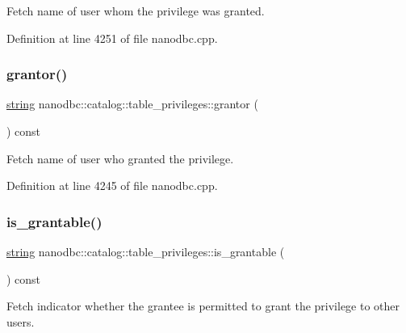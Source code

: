 Fetch name of user whom the privilege was granted. 



Definition at line 4251 of file nanodbc.\+cpp.

\mbox{\label{classnanodbc_1_1catalog_1_1table__privileges_a2b49c7a12f7e7ce3ea2c4f7106635245}} 
\subsubsection{\texorpdfstring{grantor()}{grantor()}}
{\footnotesize\ttfamily \mbox{\hyperlink{namespacenanodbc_abfc0ece56278e590911ec8352774c212}{string}} nanodbc\+::catalog\+::table\+\_\+privileges\+::grantor (\begin{DoxyParamCaption}{ }\end{DoxyParamCaption}) const}



Fetch name of user who granted the privilege. 



Definition at line 4245 of file nanodbc.\+cpp.

\mbox{\label{classnanodbc_1_1catalog_1_1table__privileges_ae281289d9513f9af912d3de4a7e1f113}} 
\subsubsection{\texorpdfstring{is\_grantable()}{is\_grantable()}}
{\footnotesize\ttfamily \mbox{\hyperlink{namespacenanodbc_abfc0ece56278e590911ec8352774c212}{string}} nanodbc\+::catalog\+::table\+\_\+privileges\+::is\+\_\+grantable (\begin{DoxyParamCaption}{ }\end{DoxyParamCaption}) const}



Fetch indicator whether the grantee is permitted to grant the privilege to other users. 



